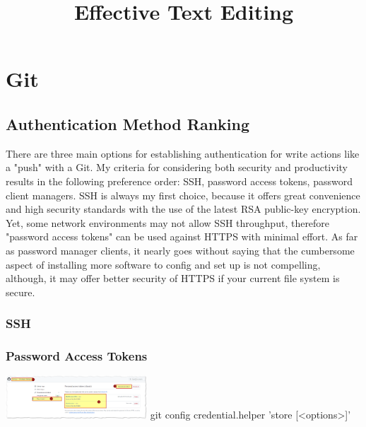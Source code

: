 \documentclass{article}
\title{Effective Text Editing}
\begin{document}
\tableofcontents
\clearpage

\section{Git}
\subsection{Authentication Method Ranking}
There are three main options for establishing authentication for write actions like a "push" with a Git.  My criteria for considering both security and productivity results in the following preference order: SSH, password access tokens, password client managers.  SSH is always my first choice, because it offers great convenience and high security standards with the use of the latest RSA public-key encryption.  Yet, some network environments may not allow SSH throughput, therefore "password access tokens" can be used against HTTPS with minimal effort.  As far as password manager clients, it nearly goes without saying that the cumbersome aspect of installing more software to config and set up is not compelling, although, it may offer better security of HTTPS if your current file system is secure.
\subsubsection{SSH}

\subsubsection{Password Access Tokens}

\includegraphics[width=200px]{images/Personal-Access-Tokens.png}
git config credential.helper 'store [<options>]'
\end{document}
